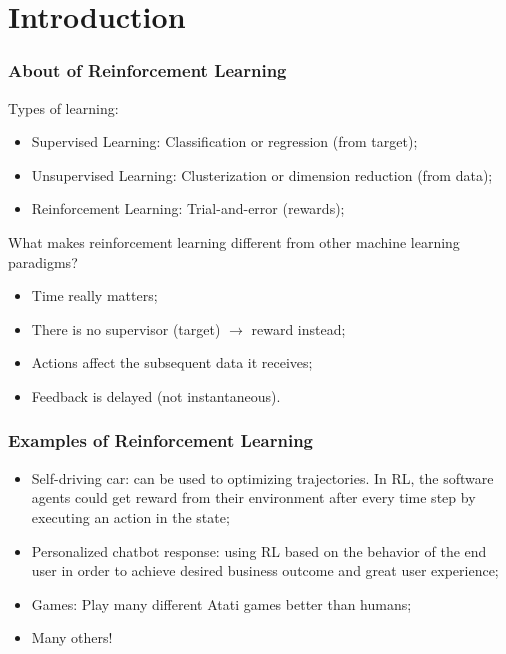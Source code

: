 


\section{Introduction} 

\begin{frame}
    \frametitle{About of Reinforcement Learning}
    
    Types of learning:
    \begin{itemize}
        \item Supervised Learning: Classification or regression (from target);
        \item Unsupervised Learning: Clusterization or dimension reduction (from data);
        \item Reinforcement Learning: Trial-and-error (rewards);
    \end{itemize}


    What makes reinforcement learning different from other machine learning 
    paradigms?

    \begin{itemize}
        \item Time really matters;
        \item There is no supervisor (target) $\rightarrow$ reward instead;
        \item Actions affect the subsequent data it receives;
        \item Feedback is delayed (not instantaneous).
    \end{itemize}


\end{frame}


\begin{frame}
    \frametitle{Examples of Reinforcement Learning}

    \begin{itemize}
        \item Self-driving car: can be used to optimizing trajectories. In RL, the software agents 
        could get reward from their environment after every time step by executing an action in the state;

        \item Personalized chatbot response: using RL based on the behavior of the end user in order to 
        achieve desired business outcome and great user experience;

        \item Games: Play many different Atati games better than humans;

        \item Many others!


    \end{itemize}

\end{frame}


